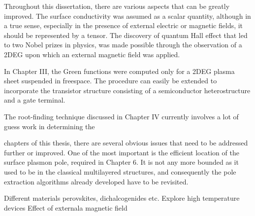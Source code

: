 Throughout this dissertation, there are various aspects that can be greatly improved. The surface conductivity was assumed as a scalar quantity, although in a true sense, especially in the presence of external electric or magnetic fields, it should be represented by a tensor. The discovery of quantum Hall effect that led to two Nobel prizes in physics, was made possible through the observation of a 2DEG upon which an external magnetic field was applied.

In Chapter III, the Green functions were computed only for a 2DEG plasma sheet suspended in freespace. The procedure can easily be extended to incorporate the transistor structure consisting of a semiconductor heterostructure and a gate terminal.

The root-finding technique discussed in Chapter IV currently involves a lot of guess work in determining the 

 chapters of this thesis, there are several obvious issues that need to be
addressed further or improved. One of the most important is the efficient location of the
surface plasmon pole, required in Chapter 6. It is not any more bounded as it used to be in
the classical multilayered structures, and consequently the pole extraction algorithms already
developed have to be revisited.



Different materials perovskites, dichalcogenides etc.
Explore high temperature devices
Effect of externala magnetic field

